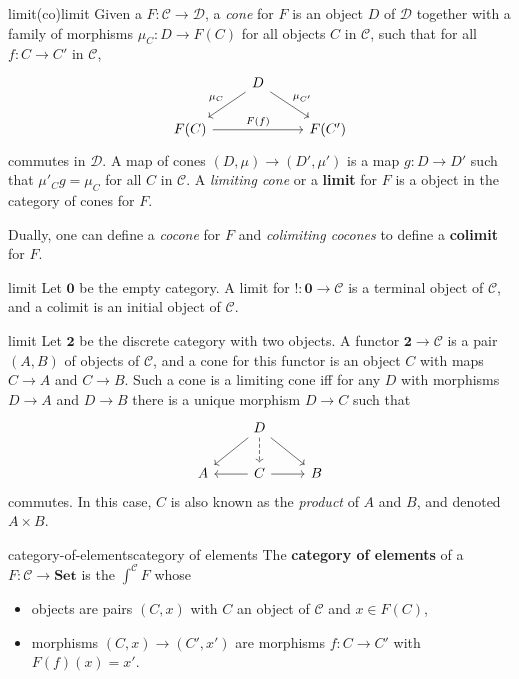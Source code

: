 \begin{topic}{limit}{(co)limit}
    Given a  $F : \mathcal{C} \to \mathcal{D}$, a \textit{cone} for $F$ is an object $D$ of $\mathcal{D}$ together with a family of morphisms $\mu_C : D \to F(C)$ for all objects $C$ in $\mathcal{C}$, such that for all $f : C \to C'$ in $\mathcal{C}$,
    \[ \begin{tikzcd} & D \arrow[swap]{ld}{\mu_C} \arrow{rd}{\mu_{C'}} & \\ F(C) \arrow{rr}{F(f)} && F(C') \end{tikzcd} \]
    commutes in $\mathcal{D}$. A map of cones $(D, \mu) \to (D', \mu')$ is a map $g : D \to D'$ such that $\mu'_C g = \mu_C$ for all $C$ in $\mathcal{C}$. A \textit{limiting cone} or a \textbf{limit} for $F$ is a  object in the category of cones for $F$.
    
    Dually, one can define a \textit{cocone} for $F$ and \textit{colimiting cocones} to define a \textbf{colimit} for $F$.
\end{topic}

\begin{example}{limit}
    Let $\textbf{0}$ be the empty category. A limit for $! : \textbf{0} \to \mathcal{C}$ is a terminal object of $\mathcal{C}$, and a colimit is an initial object of $\mathcal{C}$.
\end{example}

\begin{example}{limit}
    Let $\textbf{2}$ be the discrete category with two objects. A functor $\textbf{2} \to \mathcal{C}$ is a pair $(A, B)$ of objects of $\mathcal{C}$, and a cone for this functor is an object $C$ with maps $C \to A$ and $C \to B$. Such a cone is a limiting cone iff for any $D$ with morphisms $D \to A$ and $D \to B$ there is a unique morphism $D \to C$ such that
    \[ \begin{tikzcd} & D \arrow[dashed]{d} \arrow{ld} \arrow{rd} & \\ A & \arrow{l} C \arrow{r} & B \end{tikzcd} \]
    commutes. In this case, $C$ is also known as the \textit{product} of $A$ and $B$, and denoted $A \times B$.
\end{example}

\begin{topic}{category-of-elements}{category of elements}
    The \textbf{category of elements} of a  $F : \mathcal{C} \to \textbf{Set}$ is the  $\int^{\mathcal{C}} F$ whose
    \begin{itemize}
        \item objects are pairs $(C, x)$ with $C$ an object of $\mathcal{C}$ and $x \in F(C)$,
        \item morphisms $(C, x) \to (C', x')$ are morphisms $f : C \to C'$ with $F(f)(x) = x'$.
    \end{itemize}
\end{topic}

